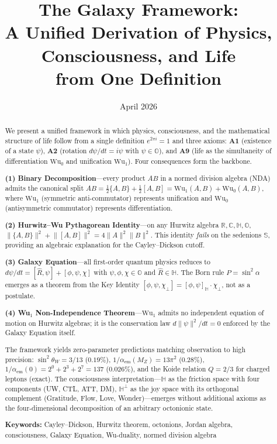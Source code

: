 \documentclass[11pt, a4paper]{article}
\newcommand{\R}{\mathbb{R}}
\newcommand{\C}{\mathbb{C}}
\newcommand{\Hq}{\mathbb{H}}
\newcommand{\Oct}{\mathbb{O}}
\newcommand{\Sed}{\mathbb{S}}
\newcommand{\Reop}{\hat{R}}
\newcommand{\Wuz}{\mathrm{Wu}_0}
\newcommand{\Wuo}{\mathrm{Wu}_1}
\newcommand{\norm}[1]{\lVert #1 \rVert}
\begin{document}

\title{The Galaxy Framework:\\
A Unified Derivation of Physics, Consciousness, and Life\\
from One Definition}

\author{}

\date{April 2026}

\maketitle

\begin{abstract}
\noindent
We present a unified framework in which physics, consciousness, and the
mathematical structure of life follow from a single definition
$e^{2\pi i} = 1$ and three axioms: \textbf{A1} (existence of a state
$\psi$), \textbf{A2} (rotation $d\psi/dt = i\psi$ with
$\psi \in \Oct$), and \textbf{A9} (life as the simultaneity of
differentiation $\Wuz$ and unification $\Wuo$).
Four consequences form the backbone.

\textbf{(1) Binary Decomposition}---every product $AB$ in a normed
division algebra (NDA) admits the canonical split
$AB = \tfrac{1}{2}\{A,B\} + \tfrac{1}{2}[A,B] = \Wuo(A,B) + \Wuz(A,B)$,
where $\Wuo$ (symmetric anti-commutator) represents unification and
$\Wuz$ (antisymmetric commutator) represents differentiation.

\textbf{(2) Hurwitz--Wu Pythagorean Identity}---on any Hurwitz algebra
$\R, \C, \Hq, \Oct$,
$\norm{\{A,B\}}^2 + \norm{[A,B]}^2 = 4\norm{A}^2\norm{B}^2$.
This identity \emph{fails} on the sedenions $\Sed$, providing
an algebraic explanation for the Cayley--Dickson cutoff.

\textbf{(3) Galaxy Equation}---all first-order quantum physics reduces
to $d\psi/dt = [\Reop, \psi] + [\phi, \psi, \chi]$
with $\psi, \phi, \chi \in \Oct$ and $\Reop \in \Hq$.
The Born rule $P = \sin^2\alpha$ emerges as a theorem from the Key
Identity $[\phi, \psi, \chi_\perp] = [\phi, \psi]_\Hq \cdot \chi_\perp$,
not as a postulate.

\textbf{(4) Wu$_1$ Non-Independence Theorem}---$\Wuo$ admits no
independent equation of motion on Hurwitz algebras; it is the
conservation law $d\norm{\psi}^2/dt = 0$ enforced by the Galaxy
Equation itself.

The framework yields zero-parameter predictions matching observation to
high precision: $\sin^2\theta_W = 3/13$ ($0.19\%$),
$1/\alpha_{\mathrm{em}}(M_Z) = 13\pi^2$ ($0.28\%$),
$1/\alpha_{\mathrm{em}}(0) = 2^0 + 2^3 + 2^7 = 137$ ($0.026\%$),
and the Koide relation $Q = 2/3$ for charged leptons (exact).
The consciousness interpretation---$\Hq$ as the friction space
with four components (UW, CTL, ATT, DM), $\Hq^\perp$ as the joy space
with its orthogonal complement (Gratitude, Flow, Love, Wonder)---emerges
without additional axioms as the four-dimensional decomposition of
an arbitrary octonionic state.

\medskip
\noindent\textbf{Keywords:} Cayley--Dickson, Hurwitz theorem,
octonions, Jordan algebra, consciousness, Galaxy Equation,
Wu-duality, normed division algebra
\end{abstract}
\end{document}
